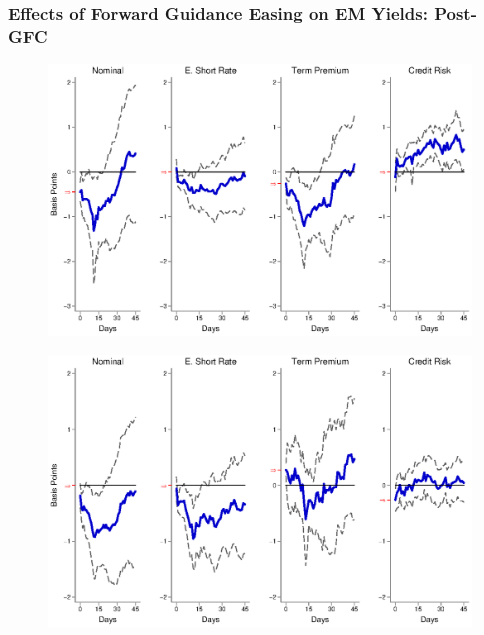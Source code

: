 \documentclass[12pt, aspectratio=169, xcolor=dvipsnames]{beamer}
\begin{document}


\begin{frame}[label=FGEMpost]
\frametitle{Effects of Forward Guidance Easing on EM Yields: Post-GFC}
\begin{figure}[!htbp]
\begin{center} %
\includegraphics[trim={0cm 0cm 0cm 0cm},clip,height=0.45\textheight,width=0.85\linewidth]{../Figures/LPs/LagDep-FX/Path/EM/PathEMnomyptpphi120mPost.eps}
\par\end{center}
\end{figure}
\vspace{-0.5cm}
\begin{figure}[!htbp]
\begin{center} %
\includegraphics[trim={0cm 0cm 0cm 0.76cm},clip,height=0.45\textheight,width=0.85\linewidth]{../Figures/LPs/LagDep-FX/Path/EM/PathEMnomyptpphi24mPost.eps}

\end{center}
\end{figure}
\end{frame}
\end{document}
